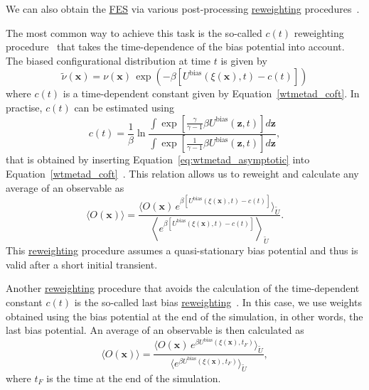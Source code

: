\documentclass[9pt,review]{livecoms}
\newcommand{\vx}{\mathbf{x}}
\newcommand{\vz}{\mathbf{z}}
\begin{document}
We can also obtain the \hyperlink{ref:FES} {FES} via various post-processing \hyperlink{ref:Reweighting} {reweighting} procedures~\cite{bonomi_rewt,tiwary_rewt,Branduardi-JCTC-2012,Schafer_RewMetaD_2020,Giberti_IterRew_JCTC2019,10.1063/1.5123498,10.1016/j.cplett.2020.137384}.

The most common way to achieve this task is the so-called $c(t)$ reweighting procedure~\cite{bonomi_rewt,tiwary_rewt} that takes the time-dependence of the bias potential into account. The biased configurational distribution at time $t$ is given by
\begin{equation}
\tilde{\nu}(\vx) = \nu(\vx) \, \exp
\left(-\beta\left[
U^{\mathrm{bias}}(\xi(\vx),t)-c(t)
\right] \right)
\end{equation}
where $c(t)$ is a time-dependent constant given by Equation~\ref{wtmetad_coft}. In practise, $c(t)$ can be estimated using
\begin{equation}
c(t) = \frac{1}{\beta} \ln
\frac
{\int \exp \left[ \frac{\gamma}{\gamma-1} \beta U^{\mathrm{bias}}(\vz,t)  \right] d\vz }
{\int \exp \left[ \frac{1}{\gamma-1} \beta U^{\mathrm{bias}}(\vz,t)  \right] d\vz },
\end{equation}
that is obtained by inserting Equation~\ref{eq:wtmetad_asymptotic} into Equation~\ref{wtmetad_coft}~\cite{tiwary_rewt,Valsson2016_ARPC_MetaD}. This relation allows us to reweight and calculate any average of an observable as
\begin{equation}
\label{wtmetad_reweighting}
\langle O(\vx) \rangle = \frac{\langle O(\vx)
\,
e^{
\beta\left[
U^{\mathrm{bias}}(\xi(\vx),t)-c(t)
\right]}\rangle_{\tilde U}}
{\left\langle
e^{\beta \left[
U^{\mathrm{bias}}(\xi(\vx),t)-c(t)
\right]} \right\rangle_{\tilde U}}.
\end{equation}
This \hyperlink{ref:Reweighting} {reweighting} procedure assumes a quasi-stationary bias potential and thus is valid after a short initial transient.

Another \hyperlink{ref:Reweighting} {reweighting} procedure that avoids the calculation of the time-dependent constant $c(t)$ is the so-called last bias \hyperlink{ref:Reweighting} {reweighting}~\cite{Branduardi-JCTC-2012}. In this case, we use weights obtained using the bias potential at the end of the simulation, in other words, the last bias potential. An average of an observable is then calculated as
\begin{equation}
\label{wtmetad_reweighting_lastbias}
\langle O(\vx) \rangle = \frac{\langle O(\vx)
\,
e^{
\beta
U^{\mathrm{bias}}(\xi(\vx),t_F)
}\rangle_{\tilde U}}
{\langle
e^{\beta
U^{\mathrm{bias}}(\xi(\vx),t_F)
} \rangle_{\tilde U}},
\end{equation}
where $t_F$ is the time at the end of the simulation.
\end{document}

